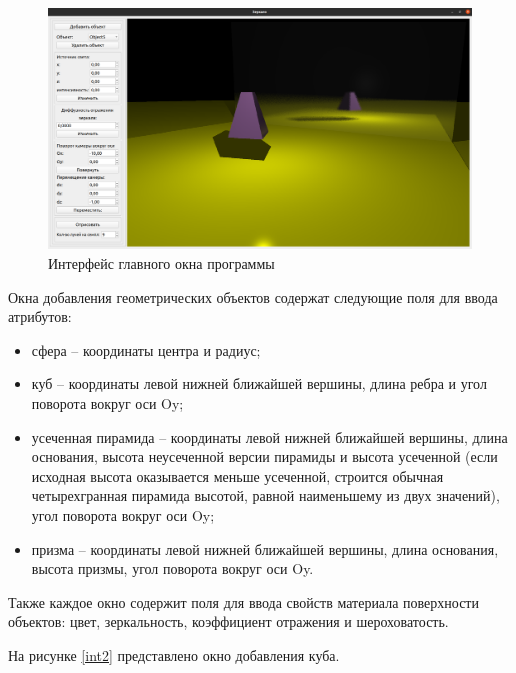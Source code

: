 \begin{figure}[H]
	\begin{center}
		\includegraphics[scale=0.25]{assets/main_interface.png}
	\end{center}
	\caption{Интерфейс главного окна программы}
	\label{main_interface}
\end{figure}

Окна добавления геометрических объектов содержат следующие поля для ввода атрибутов:
\begin{itemize}
	\item сфера -- координаты центра и радиус;
	\item куб -- координаты левой нижней ближайшей вершины, длина ребра и угол поворота вокруг оси Oy;
	\item усеченная пирамида -- координаты левой нижней ближайшей вершины, длина основания, высота неусеченной версии пирамиды и высота усеченной (если исходная высота оказывается меньше усеченной, строится обычная четырехгранная пирамида высотой, равной наименьшему из двух значений), угол поворота вокруг оси Oy;
	\item призма -- координаты левой нижней ближайшей вершины, длина основания, высота призмы, угол поворота вокруг оси Oy.
\end{itemize}
Также каждое окно содержит поля для ввода свойств материала поверхности объектов: цвет, зеркальность, коэффициент отражения и шероховатость.

\newpage
На рисунке \ref{int2} представлено окно добавления куба.


